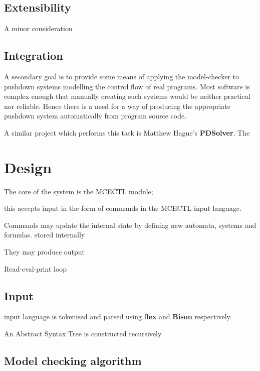 \documentclass[11pt]{article}
\begin{document}
\subsection{Extensibility}

A minor consideration 

\subsection{Integration}
A secondary goal is to provide some means of applying the model-checker to pushdown systems modelling the control flow of real programs. Most software is complex enough that manually creating such systems would be neither practical nor reliable. Hence there is a need for a way of producing the appropriate pushdown system automatically from program source code.

A similar project which performs this task is Matthew Hague's \textbf{PDSolver}.
The 

\section{Design}







The core of the system is the MCECTL module; 

this accepts input in the form of commands in the MCECTL input language. 

Commands may update the internal state by defining new automata, systems and formulas.
stored internally

They may produce output

Read-eval-print loop


\subsection{Input}
input language is tokenised and parsed using \textbf{flex} and \textbf{Bison} respectively. 

An Abstract Syntax Tree is constructed recursively 




\subsection{Model checking algorithm}
\end{document}
